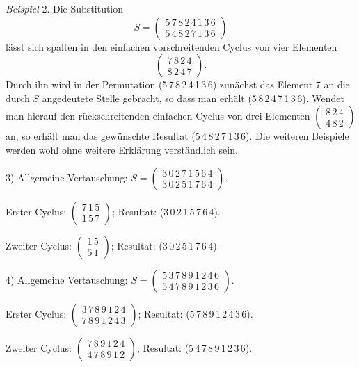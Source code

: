 \documentclass[11pt]{article}
\begin{document}
\textit{Beispiel} 2. Die Substitution
\[
S=\begin{pmatrix}5\,7\,8\,2\,4\,1\,3\,6\\5\,4\,8\,2\,7\,1\,3\,6\end{pmatrix}
\]
lässt sich spalten in den einfachen vorschreitenden Cyclus von vier
Elementen
\[
\begin{pmatrix}7\,8\,2\,4\\8\,2\,4\,7\end{pmatrix}.
\]
Durch ihn wird in der Permutation (5\,7\,8\,2\,4\,1\,3\,6) zunächst das
Element 7 an die durch $S$ angedeutete Stelle gebracht, so dass man
erhält (5\,8\,2\,4\,7\,1\,3\,6). Wendet man hierauf den
rückschreitenden einfachen Cyclus von drei Elementen
$\begin{pmatrix}8\,2\,4\\4\,8\,2\end{pmatrix}$ an, so erhält man das
gewünschte Resultat (5\,4\,8\,2\,7\,1\,3\,6). Die weiteren Beispiele
werden wohl ohne weitere Erklärung verständlich sein.

3) Allgemeine Vertauschung:
$S=\begin{pmatrix}3\,0\,2\,7\,1\,5\,6\,4\\3\,0\,2\,5\,1\,7\,6\,4\end{pmatrix}.$

Erster Cyclus: $\begin{pmatrix}7\,1\,5\\1\,5\,7\end{pmatrix}$; Resultat:
(3\,0\,2\,1\,5\,7\,6\,4).

Zweiter Cyclus: $\begin{pmatrix}1\,5\\5\,1\end{pmatrix}$; Resultat:
(3\,0\,2\,5\,1\,7\,6\,4).

4) Allgemeine Vertauschung:
$S=\begin{pmatrix}5\,3\,7\,8\,9\,1\,2\,4\,6\\5\,4\,7\,8\,9\,1\,2\,3\,6\end{pmatrix}.$

Erster Cyclus:
$\begin{pmatrix}3\,7\,8\,9\,1\,2\,4\\7\,8\,9\,1\,2\,4\,3\end{pmatrix}$;
Resultat: (5\,7\,8\,9\,1\,2\,4\,3\,6).

Zweiter Cyclus:
$\begin{pmatrix}7\,8\,9\,1\,2\,4\\4\,7\,8\,9\,1\,2\end{pmatrix}$;
Resultat: (5\,4\,7\,8\,9\,1\,2\,3\,6).
\end{document}

